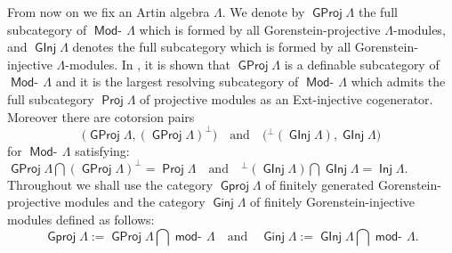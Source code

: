 \documentclass[oneside, a4paper,reqno]{amsart}
\numberwithin{equation}{section}
\theoremstyle{definition}
\begin{document}
From now on we fix an Artin algebra $\Lambda$. We denote by
${\operatorname{\mathsf{GProj}}\nolimits}{\Lambda}$ the full subcategory of $\operatorname*{\mathsf{Mod}-\!}{\Lambda}$ which is formed by all
Gorenstein-projective ${\Lambda}$-modules, and ${\operatorname{\mathsf{GInj}}\nolimits}{\Lambda}$ denotes the full
subcategory which is formed by all Gorenstein-injective
${\Lambda}$-modules. In \cite{B:cm}, it is shown that ${\operatorname{\mathsf{GProj}}\nolimits}\Lambda$ is a
definable subcategory of $\operatorname*{\mathsf{Mod}-\!}\Lambda$ and it is the largest
resolving subcategory of $\operatorname*{\mathsf{Mod}-\!}\Lambda$ which admits the full
subcategory $\operatorname*{\mathsf{Proj}}\Lambda$ of projective modules as an Ext-injective
cogenerator.  Moreover there are cotorsion pairs
\[\big({\operatorname{\mathsf{GProj}}\nolimits}{\Lambda},({\operatorname{\mathsf{GProj}}\nolimits}{\Lambda})^\perp\big) \quad\text{and} \quad
\big({^\perp({\operatorname{\mathsf{GInj}}\nolimits}{\Lambda})},{\operatorname{\mathsf{GInj}}\nolimits}{\Lambda}\big)\]
 for $\operatorname*{\mathsf{Mod}-\!}{\Lambda}$ satisfying: \,
${\operatorname{\mathsf{GProj}}\nolimits}{\Lambda}\bigcap({\operatorname{\mathsf{GProj}}\nolimits}{\Lambda})^\perp=\operatorname*{\mathsf{Proj}}{\Lambda} \quad\text{and} \quad
{^\perp({\operatorname{\mathsf{GInj}}\nolimits}{\Lambda})}\bigcap{\operatorname{\mathsf{GInj}}\nolimits}{\Lambda}=\operatorname*{\mathsf{Inj}}{\Lambda}.$
 Throughout we shall
use the category ${\operatorname{\mathsf{Gproj}}\nolimits}{\Lambda}$ of finitely generated
Gorenstein-projective modules and the category ${\operatorname{\mathsf{Ginj}}\nolimits}{\Lambda}$ of
finitely Gorenstein-injective modules defined as follows:
\[
{\operatorname{\mathsf{Gproj}}\nolimits}{\Lambda}:={\operatorname{\mathsf{GProj}}\nolimits}{\Lambda}\bigcap\operatorname*{\mathsf{mod}-\!}{\Lambda}\quad\text{and}\quad
{\operatorname{\mathsf{Ginj}}\nolimits}{\Lambda}:={\operatorname{\mathsf{GInj}}\nolimits}{\Lambda}\bigcap\operatorname*{\mathsf{mod}-\!}{\Lambda}.
\]
\end{document}
